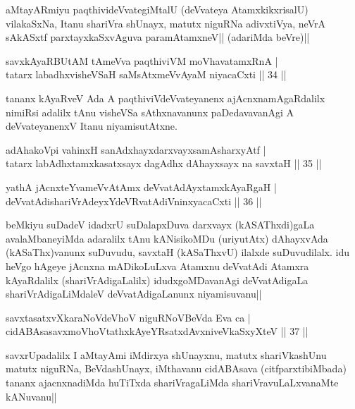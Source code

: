 \begin{artha}
aMtayARmiyu paqthivideVvategiMtalU (deVvateya AtamxkikxrisalU) vilakaSxNa, Itanu shariVra shUnayx, matutx niguRNa adivxtiVya, neVrA  sAkASxtf parxtayxkaSxvAguva paramAtamxneV|| (adariMda beVre)||
\end{artha}

\begin{shl}
savxkAyaRBUtAM tAmeVva paqthiviVM moVhavatamxRnA |\\
tatarx labadhxvisheVSaH saMsAtxmeVvAyaM niyacaCxti \hfill || 34 ||
\end{shl}

\begin{artha}%
tananx kAyaRveV Ada A paqthiviVdeVvateyanenx ajAcnxnamAgaRdalilx nimiRsi adalilx tAnu visheVSa sAthxnavanunx paDedavavanAgi A deVvateyanenxV Itanu niyamisutAtxne.
\end{artha}

\begin{shl}
adAhakoV\s pi vahinxH sanAdxhayxdarxvayxsamAsharxyAtf |\\
tatarx labAdhxtamxkasatxsayx dagAdhx dAhayxsayx na savxtaH \hfill || 35 ||
\end{shl}

\begin{shl}
yathA jAcnxteYvameVvA\s \s tAmx deVvatAdAyxtamxkAyaRgaH |\\
deVvatAdishariVrAdeyxYdeVRvatAdiVninxyacaCxti \hfill || 36 ||
\end{shl}

\begin{artha}
beMkiyu suDadeV idadxrU suDalapxDuva darxvayx (kASAThxdi)gaLa avalaMbaneyiMda adaralilx tAnu kANisikoMDu (uriyutAtx) dAhayxvAda (kASaThx)vanunx suDuvudu, savxtaH (kASaThxvU) ilalxde suDuvudilalx. idu heVgo hAgeye jAcnxna mADikoLuLxva Atamxnu deVvatAdi Atamxra kAyaRdalilx (shariVrAdigaLalilx) idudxgoMDavanAgi deVvatAdigaLa shariVrAdigaLiMdaleV deVvatAdigaLanunx niyamisuvanu||
\end{artha}


\begin{shl}
savxtasatxvXkaraNoV\s deVhoV niguRNoV\s BeVda Eva ca |\\
cidABAsasavxmoVhoVtathxkAyeYRsatxdAvxniveVkaSxyXteV \hfill || 37 ||
\end{shl}

\begin{artha}
savxrUpadalilx I aMtayAmi iMdirxya shUnayxnu, matutx shariVkashUnu matutx niguRNa, BeVdashUnayx, iMthavanu cidABAsava  (citfparxtibiMbada) tananx ajacnxnadiMda huTiTxda shariVragaLiMda shariVravuLaLxvanaMte kANuvanu||
\end{artha}

